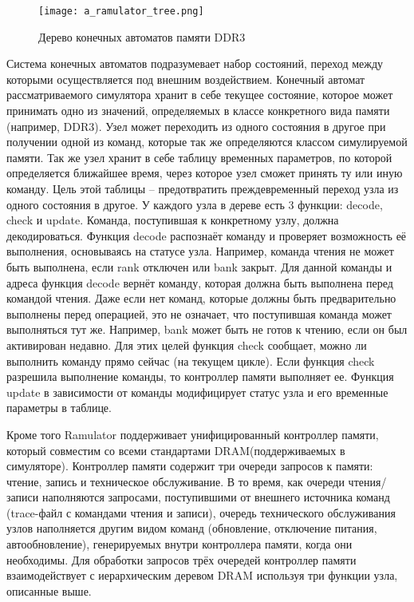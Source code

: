 \begin{figure}[ht]
\centering
  \texttt{[image: a\_ramulator\_tree.png]}  
  \caption{Дерево конечных автоматов памяти DDR3}
  \label{fig:domain:simulators:ramulator:tree}
\end{figure}

Система конечных автоматов подразумевает набор состояний, переход между которыми осуществляется под внешним воздействием. Конечный автомат рассматриваемого симулятора хранит в себе текущее состояние, которое может принимать одно из значений, определяемых в классе конкретного вида памяти (например, DDR3). Узел может переходить из одного состояния в другое при получении одной из команд, которые так же определяются классом симулируемой памяти. Так же узел хранит в себе таблицу временных параметров, по которой определяется ближайшее время, через которое узел сможет принять ту или иную команду. Цель этой таблицы – предотвратить преждевременный переход узла из одного состояния в другое.  У каждого узла в дереве есть 3 функции: decode, check и update. Команда, поступившая к конкретному узлу, должна декодироваться. Функция decode распознаёт команду и проверяет возможность её выполнения, основываясь на статусе узла. Например, команда чтения не может быть выполнена, если rank отключен или bank закрыт. Для данной команды и адреса функция decode вернёт команду, которая должна быть выполнена перед командой чтения.  Даже если нет команд, которые должны быть предварительно выполнены перед операцией, это не означает, что поступившая команда может выполняться тут же. Например, bank может быть не готов к чтению, если он был активирован недавно. Для этих целей функция check сообщает, можно ли выполнить команду прямо сейчас (на текущем цикле). Если функция check разрешила выполнение команды, то контроллер памяти выполняет ее. Функция update в зависимости от команды модифицирует статус узла и его временные параметры в таблице.

Кроме того Ramulator поддерживает унифицированный контроллер памяти, который совместим со всеми стандартами DRAM(поддерживаемых в симуляторе). Контроллер памяти содержит три очереди запросов к памяти:  чтение, запись и техническое обслуживание. В то время, как очереди чтения/записи наполняются запросами, поступившими от внешнего источника команд (trace-файл с командами чтения и записи), очередь технического обслуживания узлов наполняется другим видом команд (обновление, отключение питания, автообновление), генерируемых внутри контроллера памяти, когда они необходимы. Для обработки запросов трёх очередей контроллер памяти взаимодействует с иерархическим деревом DRAM используя три функции узла, описанные выше.  

